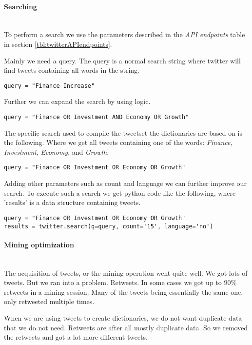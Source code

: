 \paragraph{Searching}
\hspace{0pt}\\
To perform a search we use the parameters described in the \textit{API
endpoints} table in section \ref{tbl:twitterAPIendpoints}.

Mainly we need a query. The query is a normal search string where twitter will
find tweets containing all words in the string. 
\begin{verbatim}
query = "Finance Increase"
\end{verbatim}

Further we can expand the search by using logic. 
\begin{verbatim}
query = "Finance OR Investment AND Economy OR Growth"
\end{verbatim}

The specific search used to compile the tweetset the dictionaries are based on is the
following. Where we get all tweets containing one of the words: \textit{Finance}, \textit{Investment}, \textit{Economy}, and \textit{Growth}.
\begin{verbatim}
query = "Finance OR Investment OR Economy OR Growth"
\end{verbatim}

Adding other parameters such as count and language we can further improve our
search. To execute such a search we get python code like the following, where
'results' is a data structure containing tweets.
\begin{verbatim}
query = "Finance OR Investment OR Economy OR Growth"
results = twitter.search(q=query, count='15', language='no')
\end{verbatim}
%

\paragraph{Mining optimization}
\hspace{0pt}\\
The acquisition of tweets, or the mining operation went quite well. We got lots
of tweets. But we ran into a problem. Retweets. In some cases we got up to 90\%
retweets in a mining session. Many of the tweets being essentially the same
one, only retweeted multiple times. 

When we are using tweets to create dictionaries, we do not want duplicate data
that we do not need. Retweets are after all mostly duplicate data. So we removed
the retweets and got a lot more different tweets. 

